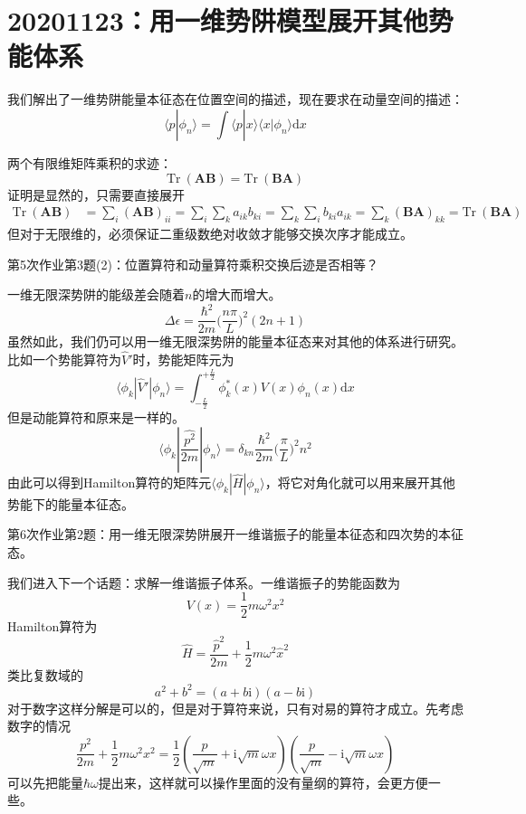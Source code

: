     \section{20201123：用一维势阱模型展开其他势能体系}
        我们解出了一维势阱能量本征态在位置空间的描述，现在要求在动量空间的描述：
        \[ \langle p|\phi_n \rangle = \int \langle p|x \rangle \langle x |\phi_n \rangle \mathrm{d}x \]

        两个有限维矩阵乘积的求迹：
        \begin{equation}
            \mathrm{Tr} \ (\bm{AB}) = \mathrm{Tr} \ (\bm{BA})
        \end{equation}
        证明是显然的，只需要直接展开
        \begin{equation}\begin{aligned}
            \mathrm{Tr} \ (\bm{AB}) &= \sum_i (\bm{AB})_{ii}
            = \sum_i \sum_k a_{ik}b_{ki}
            = \sum_k \sum_i b_{ki}a_{ik}
            = \sum_k \bm{(BA)}_{kk}
            = \mathrm{Tr} \ (\bm{BA})
        \end{aligned}\end{equation}
        但对于无限维的，必须保证二重级数绝对收敛才能够交换次序才能成立。
        \begin{asg}
            第5次作业第3题(2)：位置算符和动量算符乘积交换后迹是否相等？
        \end{asg}

        一维无限深势阱的能级差会随着$n$的增大而增大。
        \[ \Delta \epsilon = \frac {\hbar^2}{2m} \bigg(\frac {n\pi}L \bigg)^2 (2n+1) \]
        虽然如此，我们仍可以用一维无限深势阱的能量本征态来对其他的体系进行研究。比如一个势能算符为$\hat{V}'$时，势能矩阵元为
        \[
            \langle \phi_k | \hat{V}' | \phi_n \rangle = \int_{-\frac L2}^{+\frac L2} \phi_k^*(x) V(x) \phi_n(x) \mathrm{d}x 
        \]
        但是动能算符和原来是一样的。
        \[
            \langle \phi_k | \frac {\hat{p^2}}{2m} | \phi_n \rangle = \delta_{kn} \frac {\hbar^2}{2m} \bigg( \frac {\pi}L \bigg)^2 n^2
        \]
        由此可以得到Hamilton算符的矩阵元$\langle \phi_k | \hat{H} | \phi_n \rangle$，将它对角化就可以用来展开其他势能下的能量本征态。
        \begin{asg}
            第6次作业第2题：用一维无限深势阱展开一维谐振子的能量本征态和四次势的本征态。
        \end{asg}

        我们进入下一个话题：求解一维谐振子体系。一维谐振子的势能函数为
        \[ V(x) = \frac 12 m\omega^2x^2 \]
        Hamilton算符为
        \[ \hat{H} = \frac {\hat{p}^2}{2m} + \frac 12 m\omega^2 \hat{x}^2 \]
        类比复数域的
        \[ a^2 + b^2 = (a+b\mathrm{i})(a-b\mathrm{i}) \]
        对于数字这样分解是可以的，但是对于算符来说，只有对易的算符才成立。先考虑数字的情况
        \[ \frac {p^2}{2m} + \frac 12 m\omega^2 x^2 = \frac 12 (\frac p{\sqrt{m}} + \mathrm{i}\sqrt{m}\omega x)(\frac p{\sqrt{m}} - \mathrm{i}\sqrt{m}\omega x) \]
        可以先把能量$\hbar \omega$提出来，这样就可以操作里面的没有量纲的算符，会更方便一些。

